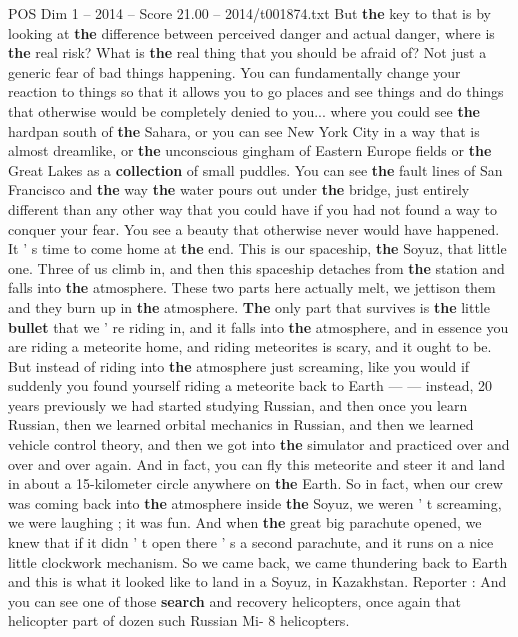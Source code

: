 \begin{textsample}{POS Dim 1 – 2014 – Score 21.00 – 2014/t001874.txt}
But \textbf{the} key to that is by looking at \textbf{the} difference between perceived danger and actual danger, where is \textbf{the} real risk?
What is \textbf{the} real thing that you should be afraid of?
Not just a generic fear of bad things happening.
You can fundamentally change your reaction to things so that it allows you to go places and see things and do things that otherwise would be completely denied to you... where you could see \textbf{the} hardpan south of \textbf{the} Sahara, or you can see New York City in a way that is almost dreamlike, or \textbf{the} unconscious gingham of Eastern Europe fields or \textbf{the} Great Lakes as a \textbf{collection} of small puddles.
You can see \textbf{the} fault lines of San Francisco and \textbf{the} way \textbf{the} water pours out under \textbf{the} bridge, just entirely different than any other way that you could have if you had not found a way to conquer your fear.
You see a beauty that otherwise never would have happened.
It ' s time to come home at \textbf{the} end.
This is our spaceship, \textbf{the} Soyuz, that little one.
Three of us climb in, and then this spaceship detaches from \textbf{the} station and falls into \textbf{the} atmosphere.
These two parts here actually melt, we jettison them and they burn up in \textbf{the} atmosphere. \textbf{The} only part that survives is \textbf{the} little \textbf{bullet} that we ' re riding in, and it falls into \textbf{the} atmosphere, and in essence you are riding a meteorite home, and riding meteorites is scary, and it ought to be.
But instead of riding into \textbf{the} atmosphere just screaming, like you would if suddenly you found yourself riding a meteorite back to Earth — — instead, 20 years previously we had started studying Russian, and then once you learn Russian, then we learned orbital mechanics in Russian, and then we learned vehicle control theory, and then we got into \textbf{the} simulator and practiced over and over and over again.
And in fact, you can fly this meteorite and steer it and land in about a 15-kilometer circle anywhere on \textbf{the} Earth.
So in fact, when our crew was coming back into \textbf{the} atmosphere inside \textbf{the} Soyuz, we weren ' t screaming, we were laughing ; it was fun.
And when \textbf{the} great big parachute opened, we knew that if it didn ' t open there ' s a second parachute, and it runs on a nice little clockwork mechanism.
So we came back, we came thundering back to Earth and this is what it looked like to land in a Soyuz, in Kazakhstan.
Reporter : And you can see one of those \textbf{search} and recovery helicopters, once again that helicopter part of dozen such Russian Mi- 8 helicopters.

\end{textsample}
